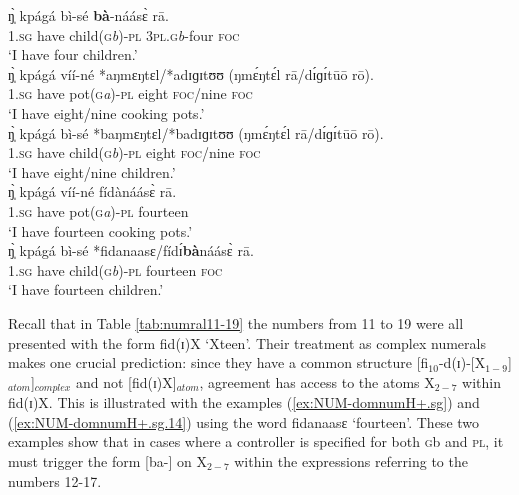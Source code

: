 \begin{exe}
\begin{exe}
\begin{exe}
{\begin{exe}
\begin{exe}
\begin{exe}
\begin{exe}
\begin{exe}
\begin{exe}
\begin{exe}
\begin{exe}
\begin{exe}
\ex\label{ex:NUM-domnumH+.pl}
\gll   ŋ̩̀  kpágá bì-sé  {\bf bà}-náásɛ̀ rā.\\
  \textsc{1.sg}  {have}  {child(\textsc{g}\textit{b})-\textsc{pl}}  
{\textsc{3pl.g}\textit{b}-four}  \textsc{foc}  \\
\glt `I have four children.'\\

\ex\label{ex:NUM-ungramhum-}
\gll   ŋ̩̀  kpágá víí-né   *aŋmɛŋtɛl/*adɪɡɪtʊʊ (ŋmɛ́ŋtɛ́l rā/dɪ́ɡɪ́tūō rō).\\
  \textsc{1.sg}  {have}  {pot(\textsc{g}\textit{a})-\textsc{pl}}  
{} {eight  \textsc{foc}/nine  \textsc{foc}}\\
\glt `I have eight/nine cooking pots.'\\

\ex\label{ex:NUM-ungramhum+}
\gll    ŋ̩̀  kpágá bì-sé   *baŋmɛŋtɛl/*badɪɡɪtʊʊ (ŋmɛ́ŋtɛ́l rā/dɪ́ɡɪ́tūō 
rō).\\
  \textsc{1.sg}  {have}  {child(\textsc{g}\textit{b})-\textsc{pl}} 
{} {eight  \textsc{foc}/nine  \textsc{foc}}\\
\glt `I have eight/nine children.'\\

\ex\label{ex:NUM-domnumH+.sg}
\gll  ŋ̩̀  kpágá víí-né   fídànáásɛ̀ rā.\\
  \textsc{1.sg}  {have}  {pot(\textsc{g}\textit{a})-\textsc{pl}}  
{fourteen}  \\
\glt `I have fourteen cooking pots.'\\


\ex\label{ex:NUM-domnumH+.sg.14}
\gll  ŋ̩̀  kpágá bì-sé   *fidanaasɛ/fídɪ́{\bf bà}náásɛ̀ rā.\\
    \textsc{1.sg}  {have}  {child(\textsc{g}\textit{b})-\textsc{pl}}  
{fourteen}  \textsc{foc}  \\
\glt `I have fourteen children.'\\
\z
\z

Recall that in Table \ref{tab:numral11-19} the numbers from 11 to 19 were all
presented with the form
{\sls  fid(ɪ)X} `Xteen'. Their treatment as complex numerals makes one 
crucial
prediction: since they   have a common structure
[fi$_{10}$-d(ɪ)-[X$_{1-9}$]$_{atom}$]$_{complex}$ and not [fid(ɪ)X]$_{atom}$,
 agreement   has
access to the atoms X$_{2-7}$ within {\sls fid(ɪ)X}. This is
illustrated with the examples (\ref{ex:NUM-domnumH+.sg}) and
(\ref{ex:NUM-domnumH+.sg.14}) using the word {\sls fidanaasɛ}
`fourteen'.
These two examples show that in cases where a controller is specified for
both \textsc{g}{\sls b} and \textsc{pl}, it must trigger the form
[ba-] on X$_{2-7}$   within the expressions referring to the numbers 12-17.




\end{exe}
\end{exe}
\end{exe}
\end{exe}
\end{exe}
\end{exe}
\end{exe}
\end{exe}
\end{exe}}
\end{exe}
\end{exe}
\end{exe}
